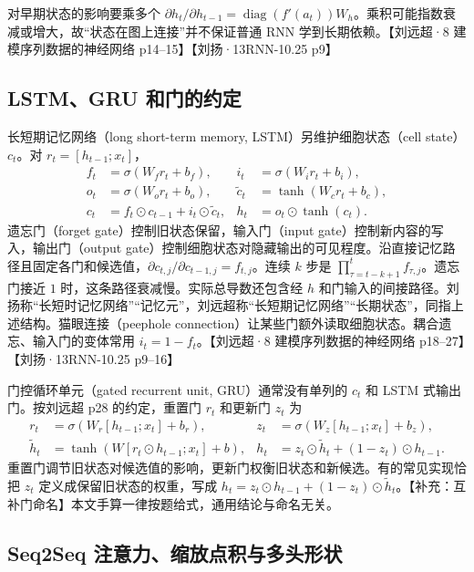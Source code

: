 \documentclass[UTF8,a4paper,zihao=-4,fontset=fandol]{ctexrep}
\begin{document}
对早期状态的影响要乘多个 $\partial h_t/\partial h_{t-1}=\operatorname{diag}(f'(a_t))W_h$。乘积可能指数衰减或增大，故“状态在图上连接”并不保证普通 RNN 学到长期依赖。【刘远超·8 建模序列数据的神经网络 p14--15】【刘扬·13RNN-10.25 p9】

\subsection*{LSTM、GRU 和门的约定}

长短期记忆网络（long short-term memory, LSTM）另维护细胞状态（cell state）$c_t$。对 $r_t=[h_{t-1};x_t]$，
\begin{align*}
 f_t&=\sigma(W_f r_t+b_f),&
 i_t&=\sigma(W_i r_t+b_i),\\
 o_t&=\sigma(W_o r_t+b_o),&
 \widetilde c_t&=\tanh(W_c r_t+b_c),\\
 c_t&=f_t\odot c_{t-1}+i_t\odot \widetilde c_t,&
 h_t&=o_t\odot\tanh(c_t).
\end{align*}
遗忘门（forget gate）控制旧状态保留，输入门（input gate）控制新内容的写入，输出门（output gate）控制细胞状态对隐藏输出的可见程度。沿直接记忆路径且固定各门和候选值，$\partial c_{t,j}/\partial c_{t-1,j}=f_{t,j}$。连续 $k$ 步是 $\prod_{\tau=t-k+1}^t f_{\tau,j}$。遗忘门接近 $1$ 时，这条路径衰减慢。实际总导数还包含经 $h$ 和门输入的间接路径。刘扬称“长短时记忆网络”“记忆元”，刘远超称“长短期记忆网络”“长期状态”，同指上述结构。猫眼连接（peephole connection）让某些门额外读取细胞状态。耦合遗忘、输入门的变体常用 $i_t=1-f_t$。【刘远超·8 建模序列数据的神经网络 p18--27】【刘扬·13RNN-10.25 p9--16】

门控循环单元（gated recurrent unit, GRU）通常没有单列的 $c_t$ 和 LSTM 式输出门。按刘远超 p28 的约定，重置门 $r_t$ 和更新门 $z_t$ 为
\begin{align*}
 r_t&=\sigma(W_r[h_{t-1};x_t]+b_r),&
 z_t&=\sigma(W_z[h_{t-1};x_t]+b_z),\\
 \widetilde h_t&=\tanh(W[r_t\odot h_{t-1};x_t]+b),&
 h_t&=z_t\odot\widetilde h_t+(1-z_t)\odot h_{t-1}.
\end{align*}
重置门调节旧状态对候选值的影响，更新门权衡旧状态和新候选。有的常见实现恰把 $z_t$ 定义成保留旧状态的权重，写成 $h_t=z_t\odot h_{t-1}+(1-z_t)\odot\widetilde h_t$。【补充：互补门命名】本文手算一律按题给式，通用结论与命名无关。

\subsection*{Seq2Seq 注意力、缩放点积与多头形状}
\end{document}
